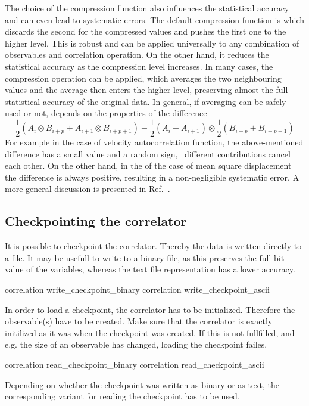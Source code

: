 The choice of the compression function also influences the statistical
accuracy and can even lead to systematic errors. The default compression 
function is  which discards the second for the compressed 
values and pushes the first one to the higher level. This is robust and 
can be applied universally to any combination of observables and
correlation operation. On the other hand, it reduces the
statistical accuracy as the compression level increases.
In many cases, the  compression operation
can be applied, which averages the two neighbouring values
and the average then enters the higher level, preserving
almost the full statistical accuracy of the original data. 
In general, if averaging can be safely used or not, depends on the 
properties of the difference
\begin{equation} 
\frac{1}{2} (A_i \otimes B_{i+p} + A_{i+1} \otimes B_{i+p+1} ) - 
\frac{1}{2} (A_i + A_{i+1} ) \otimes \frac{1}{2} (B_{i+p} +  B_{i+p+1})
\label{eq:difference}
\end{equation} 
For example in the case of velocity autocorrelation function, the
above-mentioned difference has a small value and a random sign, \ie\ 
different contributions cancel each other. On the other hand, in the
of the case of mean square displacement the difference is always positive,
resulting in a non-negligible systematic error. A more general
discussion is presented in Ref.~\cite{ramirez10a}.


\subsection{Checkpointing the correlator}
It is possible to checkpoint the correlator. Thereby the data is written
directly to a file. It may be usefull to write to a binary file, as this
preserves the full bit-value of the variables, whereas the text file 
representation has a lower accuracy.

\begin{essyntax}
 correlation  write_checkpoint_binary 
\variant{2} correlation \var{id} write_checkpoint_ascii \var{filename}
\end{essyntax}

In order to load a checkpoint, the correlator has to be initialized. Therefore
the observable(s) have to be created. Make sure that the correlator is exactly
initilized as it was when the checkpoint was created. If this is not
fullfilled, and e.g. the size of an observable has changed, loading the
checkpoint failes.
\begin{essyntax}
 correlation  read_checkpoint_binary 
\variant{2} correlation \var{id} read_checkpoint_ascii \var{filename}
\end{essyntax}
Depending on whether the checkpoint was written as binary or as text, the
corresponding variant for reading the checkpoint has to be used.

